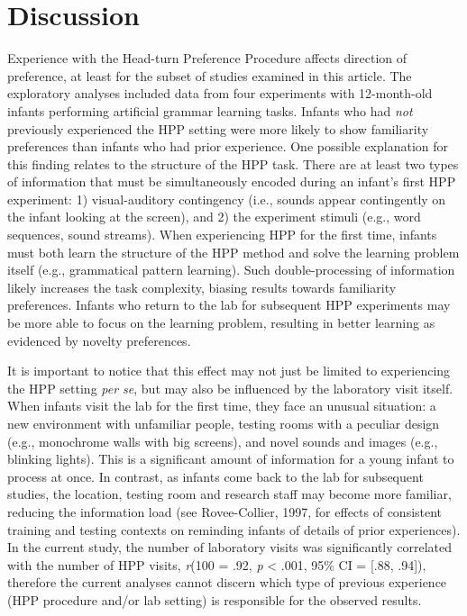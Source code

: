 \documentclass[
  english,
  man,man,floatsintext]{apa6}
\begin{document}
\hypertarget{discussion}{%
\section{Discussion}\label{discussion}}

Experience with the Head-turn Preference Procedure affects direction of preference, at least for the subset of studies examined in this article. The exploratory analyses included data from four experiments with 12-month-old infants performing artificial grammar learning tasks. Infants who had \emph{not} previously experienced the HPP setting were more likely to show familiarity preferences than infants who had prior experience. One possible explanation for this finding relates to the structure of the HPP task. There are at least two types of information that must be simultaneously encoded during an infant's first HPP experiment: 1) visual-auditory contingency (i.e., sounds appear contingently on the infant looking at the screen), and 2) the experiment stimuli (e.g., word sequences, sound streams). When experiencing HPP for the first time, infants must both learn the structure of the HPP method and solve the learning problem itself (e.g., grammatical pattern learning). Such double-processing of information likely increases the task complexity, biasing results towards familiarity preferences. Infants who return to the lab for subsequent HPP experiments may be more able to focus on the learning problem, resulting in better learning as evidenced by novelty preferences.

It is important to notice that this effect may not just be limited to experiencing the HPP setting \emph{per se}, but may also be influenced by the laboratory visit itself. When infants visit the lab for the first time, they face an unusual situation: a new environment with unfamiliar people, testing rooms with a peculiar design (e.g., monochrome walls with big screens), and novel sounds and images (e.g., blinking lights). This is a significant amount of information for a young infant to process at once. In contrast, as infants come back to the lab for subsequent studies, the location, testing room and research staff may become more familiar, reducing the information load (see Rovee-Collier, 1997, for effects of consistent training and testing contexts on reminding infants of details of prior experiences). In the current study, the number of laboratory visits was significantly correlated with the number of HPP visits, \emph{r}(100 = .92, \emph{p} \textless{} .001, 95\% CI = {[}.88, .94{]}), therefore the current analyses cannot discern which type of previous experience (HPP procedure and/or lab setting) is responsible for the observed results.
\end{document}
